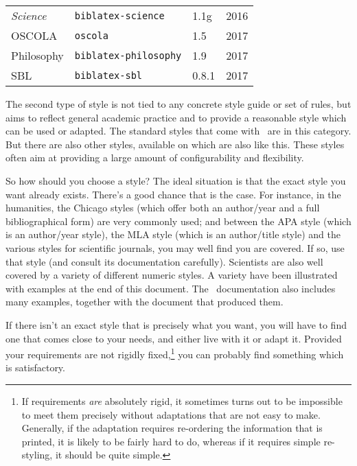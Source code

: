 \begin{table}
\begin{tabular}{llll}
\textit{Science}                 & \texttt{biblatex-science}        & 1.1g             & 2016          \\
OSCOLA                           & \texttt{oscola}                  & 1.5              & 2017          \\
Philosophy                       & \texttt{biblatex-philosophy}     & 1.9              & 2017          \\
SBL                              & \texttt{biblatex-sbl}            & 0.8.1            & 2017          \\
\bottomrule
\end{tabular}
\end{table}


The second type of style is not tied to any concrete style guide or
set of rules, but aims to reflect general academic practice and to
provide a reasonable style which can be used or
adapted. The standard styles that come with \biblatex\ are in this
category. But there are also other styles, available on
 which are also like this. These styles often aim at
providing a large amount of configurability and
flexibility.

So how should you choose a style? The ideal situation is that the
exact style you want already exists. There's a good chance that is the
case. For instance, in the humanities, the Chicago styles (which offer
both an author/year and a full bibliographical form) are very commonly
used; and between the APA style (which is an author/year style), the
MLA style (which is an author/title style) and the various styles for
scientific journals, you may well find you are covered. If so, use
that style (and consult its documentation carefully). Scientists are
also well covered by a variety of different numeric styles. A variety
have been illustrated with examples at the end of this
document. The \biblatex\
documentation also includes many examples, together with the document
that produced them.

If there isn't an exact style that is precisely what you want, you
will have to find one that comes close to your needs, and either live
with it or adapt it. Provided your requirements are not rigidly
fixed,\footnote[][-3ex]{If requirements \emph{are} absolutely
  rigid, it sometimes turns out to be impossible to meet them
  precisely without adaptations that are not easy to make. Generally,
  if the adaptation requires re-ordering the information that is
  printed, it is likely to be fairly hard to do, whereas if it
  requires simple re-styling, it should be quite simple.} you can
probably find something which is satisfactory.

